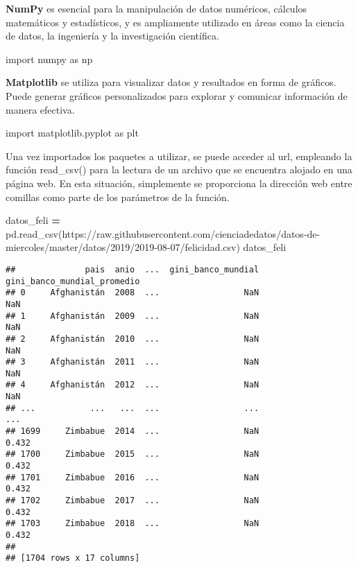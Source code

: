 \documentclass[
]{article}
\newenvironment{Shaded}{\begin{snugshade}}{\end{snugshade}}
\newcommand{\ImportTok}[1]{#1}
\newcommand{\NormalTok}[1]{#1}
\newcommand{\OperatorTok}[1]{\textcolor[rgb]{0.81,0.36,0.00}{\textbf{#1}}}
\newcommand{\StringTok}[1]{\textcolor[rgb]{0.31,0.60,0.02}{#1}}
\begin{document}
\textbf{NumPy} es esencial para la manipulación de datos numéricos,
cálculos matemáticos y estadísticos, y es ampliamente utilizado en áreas
como la ciencia de datos, la ingeniería y la investigación científica.

\begin{Shaded}
\begin{Highlighting}[]
\ImportTok{import}\NormalTok{ numpy }\ImportTok{as}\NormalTok{ np}
\end{Highlighting}
\end{Shaded}

\textbf{Matplotlib} se utiliza para visualizar datos y resultados en
forma de gráficos. Puede generar gráficos personalizados para explorar y
comunicar información de manera efectiva.

\begin{Shaded}
\begin{Highlighting}[]
\ImportTok{import}\NormalTok{ matplotlib.pyplot }\ImportTok{as}\NormalTok{ plt}
\end{Highlighting}
\end{Shaded}

Una vez importados los paquetes a utilizar, se puede acceder al url,
empleando la función read\_csv() para la lectura de un archivo que se
encuentra alojado en una página web. En esta situación, simplemente se
proporciona la dirección web entre comillas como parte de los parámetros
de la función.

\begin{Shaded}
\begin{Highlighting}[]
\NormalTok{datos\_feli }\OperatorTok{=}\NormalTok{ pd.read\_csv(}\StringTok{\textquotesingle{}https://raw.githubusercontent.com/cienciadedatos/datos{-}de{-}miercoles/master/datos/2019/2019{-}08{-}07/felicidad.csv\textquotesingle{}}\NormalTok{)}
\NormalTok{datos\_feli}
\end{Highlighting}
\end{Shaded}

\begin{verbatim}
##              pais  anio  ...  gini_banco_mundial  gini_banco_mundial_promedio
## 0     Afghanistán  2008  ...                 NaN                          NaN
## 1     Afghanistán  2009  ...                 NaN                          NaN
## 2     Afghanistán  2010  ...                 NaN                          NaN
## 3     Afghanistán  2011  ...                 NaN                          NaN
## 4     Afghanistán  2012  ...                 NaN                          NaN
## ...           ...   ...  ...                 ...                          ...
## 1699     Zimbabue  2014  ...                 NaN                        0.432
## 1700     Zimbabue  2015  ...                 NaN                        0.432
## 1701     Zimbabue  2016  ...                 NaN                        0.432
## 1702     Zimbabue  2017  ...                 NaN                        0.432
## 1703     Zimbabue  2018  ...                 NaN                        0.432
## 
## [1704 rows x 17 columns]
\end{verbatim}
\end{document}
